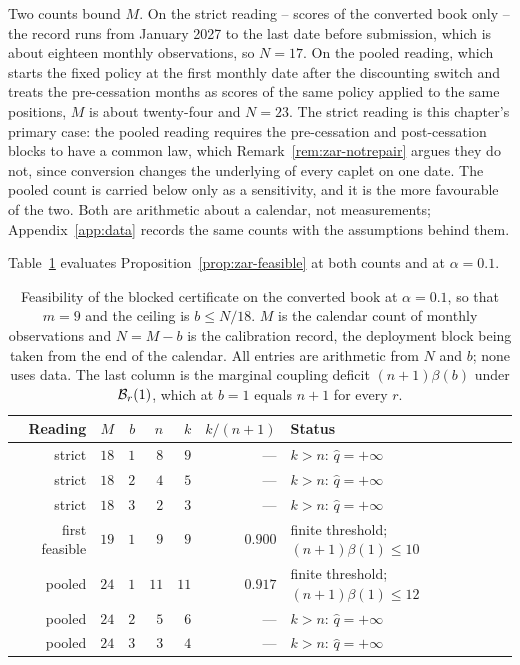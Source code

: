 \documentclass[../../../main.tex]{subfiles}
\begin{document}
Two counts bound $M$. On the strict reading -- scores of the converted book only -- the record runs from January 2027 to the last date before submission, which is about eighteen monthly observations, so $N=17$. On the pooled reading, which starts the fixed policy at the first monthly date after the discounting switch and treats the pre-cessation months as scores of the same policy applied to the same positions, $M$ is about twenty-four and $N=23$. The strict reading is this chapter's primary case: the pooled reading requires the pre-cessation and post-cessation blocks to have a common law, which Remark~\ref{rem:zar-notrepair} argues they do not, since conversion changes the underlying of every caplet on one date. The pooled count is carried below only as a sensitivity, and it is the more favourable of the two. Both are arithmetic about a calendar, not measurements; Appendix~\ref{app:data} records the same counts with the assumptions behind them.

Table~\ref{tab:zar-feasible} evaluates Proposition~\ref{prop:zar-feasible} at both counts and at $\alpha=0.1$.

\begin{table}[htbp]\centering\small
\caption{Feasibility of the blocked certificate on the converted book at $\alpha=0.1$, so that $m=9$ and the ceiling is $b\le N/18$. $M$ is the calendar count of monthly observations and $N=M-b$ is the calibration record, the deployment block being taken from the end of the calendar. All entries are arithmetic from $N$ and $b$; none uses data. The last column is the marginal coupling deficit $(n+1)\beta(b)$ under $\mathcal B_{r}(1)$, which at $b=1$ equals $n+1$ for every $r$.}\label{tab:zar-feasible}
\begin{tabular}{@{}rrrrrrl@{}}
\toprule
Reading & $M$ & $b$ & $n$ & $k$ & $k/(n+1)$ & Status \\
\midrule
strict & $18$ & $1$ & $8$ & $9$ & --- & $k>n$: $\hat q=+\infty$ \\
strict & $18$ & $2$ & $4$ & $5$ & --- & $k>n$: $\hat q=+\infty$ \\
strict & $18$ & $3$ & $2$ & $3$ & --- & $k>n$: $\hat q=+\infty$ \\
first feasible & $19$ & $1$ & $9$ & $9$ & $0.900$ & finite threshold; $(n+1)\beta(1)\le10$ \\
pooled & $24$ & $1$ & $11$ & $11$ & $0.917$ & finite threshold; $(n+1)\beta(1)\le12$ \\
pooled & $24$ & $2$ & $5$ & $6$ & --- & $k>n$: $\hat q=+\infty$ \\
pooled & $24$ & $3$ & $3$ & $4$ & --- & $k>n$: $\hat q=+\infty$ \\
\bottomrule
\end{tabular}
\end{table}
\end{document}
